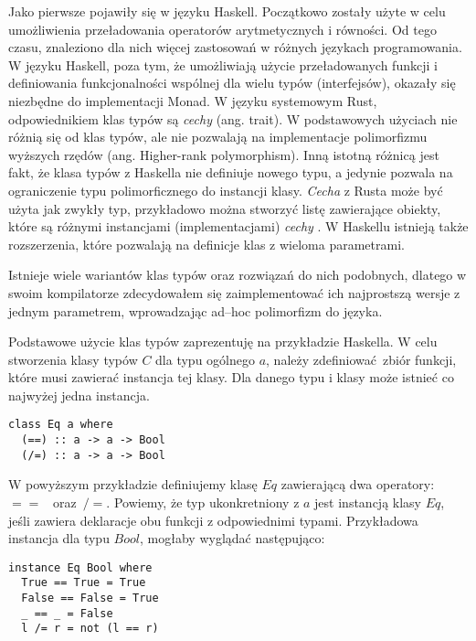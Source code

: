 \documentclass[declaration,shortabstract]{iithesis}
\begin{document}
Jako pierwsze pojawiły się w języku Haskell\cite{tc_wiki}. 
Początkowo zostały użyte w celu umożliwienia przeładowania operatorów 
arytmetycznych i równości. Od tego czasu, 
znaleziono dla nich więcej zastosowań w różnych językach programowania. W języku
Haskell, poza tym, że umożliwiają użycie przeładowanych funkcji i definiowania 
funkcjonalności wspólnej dla wielu typów (interfejsów), okazały się niezbędne 
do implementacji Monad. W języku systemowym Rust, odpowiednikiem klas typów są
\textit{cechy} (ang. trait). W podstawowych użyciach nie różnią się od klas typów, ale 
nie pozwalają na implementacje polimorfizmu wyższych rzędów 
\cite{no_hkt_in_rust} (ang. 
Higher-rank polymorphism). Inną istotną różnicą jest fakt, że klasa typów z 
Haskella nie definiuje nowego typu, a jedynie pozwala na ograniczenie typu
polimorficznego do 
instancji klasy. \textit{Cecha} z Rusta może być użyta jak zwykły typ, przykładowo 
można stworzyć listę zawierające obiekty, które są różnymi instancjami 
(implementacjami) \textit{cechy} \cite{traits_as_obj_rust}. W Haskellu istnieją także rozszerzenia, które 
pozwalają na definicje klas z wieloma parametrami. 


Istnieje wiele wariantów klas typów oraz rozwiązań do nich podobnych, dlatego w swoim 
kompilatorze zdecydowałem się zaimplementować ich najprostszą wersje z jednym 
parametrem, wprowadzając ad--hoc polimorfizm do języka.

Podstawowe użycie klas typów zaprezentuję na przykładzie Haskella. 
W celu stworzenia klasy typów $C$ dla typu ogólnego $a$, należy 
zdefiniować zbiór funkcji, które musi zawierać instancja tej klasy. Dla danego 
typu i klasy może istnieć co najwyżej jedna instancja. 

\begin{lstlisting}[frame=single, caption=Przykładowa definicja klasy typów.]
class Eq a where
  (==) :: a -> a -> Bool
  (/=) :: a -> a -> Bool
\end{lstlisting}

W powyższym przykładzie definiujemy klasę $Eq$ zawierającą dwa operatory:~$==$ 
~oraz~$/=$. Powiemy, że typ ukonkretniony z $a$ jest instancją klasy $Eq$, 
jeśli zawiera deklaracje obu funkcji z odpowiednimi typami. Przykładowa 
instancja dla typu $Bool$, mogłaby wyglądać następująco:

\begin{lstlisting}[frame=single, caption=Instancja klasy $Eq$ dla typu $Bool$.]
instance Eq Bool where
  True == True = True 
  False == False = True 
  _ == _ = False
  l /= r = not (l == r)
\end{lstlisting}
\end{document}
